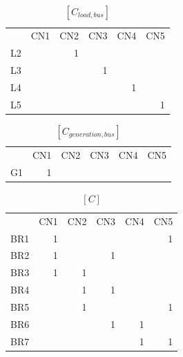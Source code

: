 \documentclass[nols,a4paper,twoside,symmetric,notoc,fleqn]{tufte-book}
\begin{document}
\begin{table}[h!]
	\begin{tabular}{lrrrrr}
		{} &  CN1 &  CN2 &  CN3 &  CN4 &  CN5 \\
		L2 &      &    1 &      &      &      \\
		L3 &      &      &    1 &      &      \\
		L4 &      &      &      &    1 &      \\
		L5 &      &      &      &      &    1 \\
	\end{tabular}
\caption{$[C_{load, bus}]$}
\end{table}








\begin{table}[h!]
	\begin{tabular}{lrrrrr}
		{} &  CN1 &  CN2 &  CN3 &  CN4 &  CN5 \\
		G1 &    1 &      &      &      &      \\
	\end{tabular}
\caption{$[C_{generation, bus}]$}
\end{table}




\begin{table}[h!]
	\begin{tabular}{lrrrrr}
		{} &  CN1 &  CN2 &  CN3 &  CN4 &  CN5 \\
		BR1 &    1 &      &      &      &    1 \\
		BR2 &    1 &      &    1 &      &      \\
		BR3 &    1 &    1 &      &      &      \\
		BR4 &      &    1 &    1 &      &      \\
		BR5 &      &    1 &      &      &    1 \\
		BR6 &      &      &    1 &    1 &      \\
		BR7 &      &      &      &    1 &    1 \\
	\end{tabular}
\caption{$[C]$}
\end{table}
\end{document}
